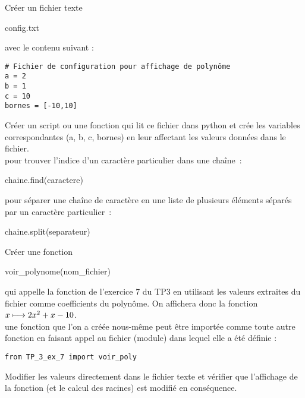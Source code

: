 \begin{correction}

\end{correction}

\begin{enonce}
	[Fichier de configuration]

	\ques Créer un fichier texte \begin{texttt}config.txt\end{texttt} avec le contenu suivant :\\

	\begin{verbatim}# Fichier de configuration pour affichage de polynôme
a = 2
b = 1 
c = 10
bornes = [-10,10]

\end{verbatim}

	\ques Créer un script ou une fonction qui lit ce fichier dans python et crée les variables correspondantes (a, b, c, bornes) en leur affectant les valeurs données dans le fichier.\\

	 pour trouver l'indice d'un caractère particulier dans une chaîne : \begin{texttt}chaine.find(caractere)\end{texttt}
	pour séparer une chaîne de caractère en une liste de plusieurs éléments séparés par un caractère particulier : \begin{texttt}chaine.split(separateur)\end{texttt}

	\ques Créer une fonction \begin{texttt}voir\_polynome(nom\_fichier)\end{texttt} qui appelle la fonction de l'exercice 7 du TP3 en utilisant les valeurs extraites du fichier comme coefficients du polynôme. On affichera donc la fonction $x \longmapsto 2x^2 + x -10$.\\

	 une fonction que l'on a créée nous-même peut être importée comme toute autre fonction en faisant appel au fichier (module) dans lequel elle a été définie : \begin{verbatim}from TP_3_ex_7 import voir_poly\end{verbatim}

	\ques Modifier les valeurs directement dans le fichier texte et vérifier que l'affichage de la fonction (et le calcul des racines) est modifié en conséquence.

\end{enonce}

